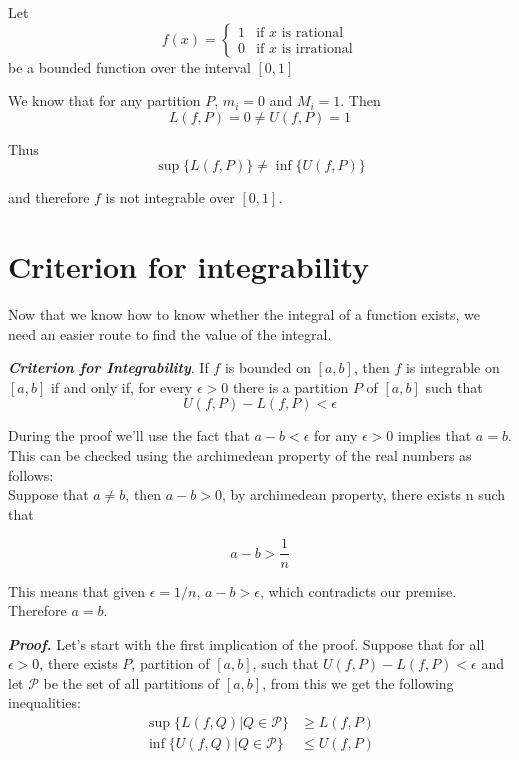 \documentclass{report}
\begin{document}
    \begin{Example}
        Let $$f(x) =
        \begin{cases}
        1 & \text{if } x \text{ is rational} \\
        0 & \text{if } x \text{ is irrational}
        \end{cases}$$
        be a bounded function over the interval $[0,1]$

        We know that for any partition $P$, $m_i = 0$ and $M_i = 1$. Then
        $$ L(f, P) = 0 \neq U(f, P) = 1$$

        Thus
        $$\sup\{L(f, P)\} \neq \inf\{U(f, P)\}$$

        and therefore $f$ is not integrable over $[0,1]$.
    \end{Example}

    \section{Criterion for integrability}
    Now that we know how to know whether the integral of a function exists, we need an easier route to find the value of the integral.

    \begin{thBox}
        \textit{\textbf{Criterion for Integrability}}. If $f$ is bounded on $[a,b]$, then $f$ is integrable on $[a,b]$ if and only if, for every $\epsilon > 0$ there is a partition $P$ of $[a,b]$ such that
        $$U(f,P)- L(f,P) < \epsilon$$
    \end{thBox}

    \begin{noteBox}
        During the proof we'll use the fact that $a-b < \epsilon$ for any $\epsilon > 0$ implies that $a = b$. This can be checked using the archimedean property of the real numbers as follows:\\

        Suppose that $a \not = b$, then $a-b > 0$, by archimedean property, there exists n such that

        $$a-b > \frac{1}{n}$$

        This means that given $\epsilon = 1/n$, $a-b>\epsilon$, which contradicts our premise. Therefore $a=b$.
    \end{noteBox}

    \textit{\textbf{Proof.}} Let's start with the first implication of the proof. Suppose that for all $\epsilon > 0$, there exists $P$, partition of $[a,b]$, such that $U(f, P) - L(f, P) < \epsilon$ and let $\mathcal{P}$ be the set of all partitions of $[a,b]$, from this we get the following inequalities:
    \begin{align}
        \sup\{L(f, Q) | Q \in \mathcal{P}\} &\geq L(f,P)\\
        \inf\{U(f, Q) | Q \in \mathcal{P}\} &\leq U(f,P)
    \end{align}
\end{document}
